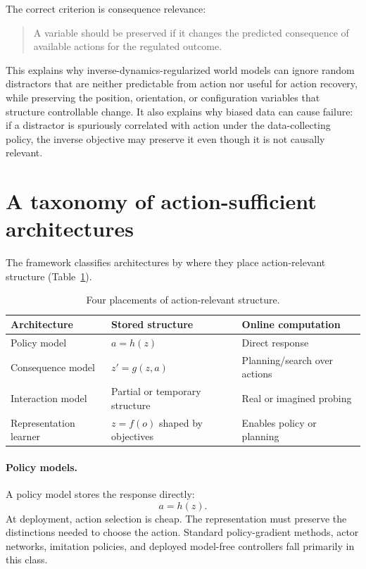 \documentclass[11pt]{article}
\theoremstyle{remark}
\newcommand{\1}{\mathbb 1}
\begin{document}
The correct criterion is consequence relevance:
\begin{quote}
A variable should be preserved if it changes the predicted consequence of available actions for the regulated outcome.
\end{quote}

This explains why inverse-dynamics-regularized world models can ignore random distractors that are neither predictable from action nor useful for action recovery, while preserving the position, orientation, or configuration variables that structure controllable change. It also explains why biased data can cause failure: if a distractor is spuriously correlated with action under the data-collecting policy, the inverse objective may preserve it even though it is not causally relevant.

\section{A taxonomy of action-sufficient architectures}

The framework classifies architectures by where they place action-relevant structure (Table~\ref{tab:taxonomy}).

\begin{table}[h]
\centering
\begin{tabular}{lll}
\toprule
Architecture & Stored structure & Online computation \\
\midrule
Policy model & $a=h(z)$ & Direct response \\
Consequence model & $z'=g(z,a)$ & Planning/search over actions \\
Interaction model & Partial or temporary structure & Real or imagined probing \\
Representation learner & $z=f(o)$ shaped by objectives & Enables policy or planning \\
\bottomrule
\end{tabular}
\caption{Four placements of action-relevant structure.}
\label{tab:taxonomy}
\end{table}

\paragraph{Policy models.}
A policy model stores the response directly:
\begin{equation}
    a=h(z).
\end{equation}
At deployment, action selection is cheap. The representation must preserve the distinctions needed to choose the action. Standard policy-gradient methods, actor networks, imitation policies, and deployed model-free controllers fall primarily in this class.
\end{document}
